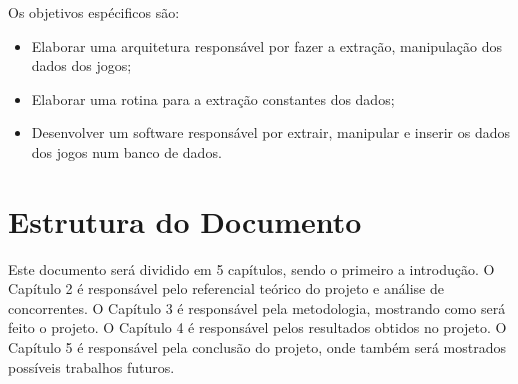 	Os objetivos espécificos são:
	\begin{itemize}
		\item Elaborar uma arquitetura responsável por fazer a extração, manipulação dos dados dos jogos;
		\item Elaborar uma rotina para a extração constantes dos dados;
		\item Desenvolver um software responsável por extrair, manipular e inserir os dados dos jogos num banco de dados.
	\end{itemize}
\section{Estrutura do Documento}
Este documento será dividido em 5 capítulos, sendo o primeiro a introdução. O Capítulo 2 é responsável pelo referencial teórico do projeto e análise de concorrentes. O Capítulo 3 é responsável pela metodologia, mostrando como será feito o projeto. O Capítulo 4 é responsável pelos resultados obtidos no projeto. O Capítulo 5 é responsável pela conclusão do projeto, onde também será mostrados possíveis trabalhos futuros.